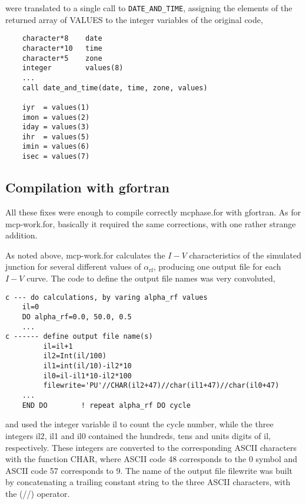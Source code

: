 were translated to a single call to \lstinline[columns=fixed]{DATE_AND_TIME}, assigning the elements of the returned array of \textsf{VALUES} to the integer variables of the original code,

\begin{lstlisting}
	character*8    date
	character*10   time
	character*5    zone
	integer        values(8)
	...
	call date_and_time(date, time, zone, values)

	iyr  = values(1)
	imon = values(2)
	iday = values(3)
	ihr  = values(5)
	imin = values(6)
	isec = values(7)
\end{lstlisting}



\subsection{Compilation with gfortran}
\label{compilation-with-gfortran}

All these fixes were enough to compile correctly \textsf{mcphase.for} with gfortran.
As for \textsf{mcp-work.for}, basically it required the same corrections, with one rather strange addition.

As noted above, \textsf{mcp-work.for} calculates the $I - V$ characteristics of the simulated junction for several different values of $\alpha_\mathrm{rf}$, producing one output file for each $I - V$ curve. The code to define the output file names was very convoluted,

\begin{lstlisting}
c --- do calculations, by varing alpha_rf values
	il=0
	DO alpha_rf=0.0, 50.0, 0.5
	...
c ------ define output file name(s)
         il=il+1
         il2=Int(il/100)
         il1=int(il/10)-il2*10
         il0=il-il1*10-il2*100
         filewrite='PU'//CHAR(il2+47)//char(il1+47)//char(il0+47)
	...
	END DO        ! repeat alpha_rf DO cycle

\end{lstlisting}

and used the integer variable \textsf{il} to count the cycle number, while the three integers \textsf{il2}, \textsf{il1} and \textsf{il0} contained the hundreds, tens and units digits of \textsf{il}, respectively. 
These integers are converted to the corresponding \textsf{ASCII} characters with the function \textsf{CHAR}, where \textsf{ASCII} code 48 corresponds to the \textsf{0} symbol and \textsf{ASCII} code 57 corresponds to \textsf{9}.
The name of the output file \textsf{filewrite} was built by concatenating a trailing constant string to the three \textsf{ASCII} characters, with the \textsf(//) operator.

